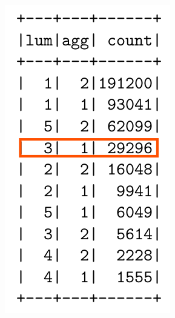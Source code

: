 \documentclass{beamer}
\theoremstyle{definition}
\begin{document}
\begin{frame}
\begin{minipage}[t]{1\linewidth}
\begin{minipage}[t]{0.3\linewidth}
\begin{figure}
\begin{center}
					\includegraphics[width=1\linewidth]{lum3.png}			
				\end{center}
				
		\end{figure}\end{minipage}

	\end{minipage}	
	
\end{frame}
\end{document}
